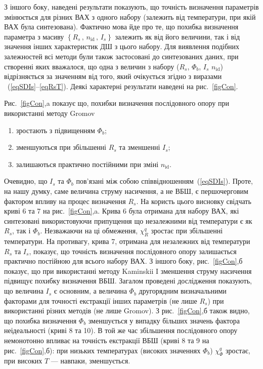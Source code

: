 З іншого боку, наведені результати показують, що точність визначення параметрів змінюється для різних ВАХ з одного набору (залежить від температури, при якій ВАХ була синтезована).
Фактично мова йде про те, що похибка визначення параметра з масиву $\left\{R_s\,,\,n_\mathrm{id}\,,\, I_s\right\}$ залежить як від його величини, так і від значення інших характеристик ДШ з цього набору.
Для виявлення подібних залежностей всі методи були також застосовані до синтезованих даних, при створенні яких вважалося, що одна з величин з набору ($R_s$, $\Phi_b$, $I_s$ $n_\mathrm{id}$) відрізняється за значенням від того, який очікується згідно з виразами ~(\ref{eqSDIs}--\ref{eqRsT}).
Деякі характерні результати наведені на рис.~\ref{figCon}.

Рис.~\ref{figCon},a показує що, похибки визначення послідовного опору при використанні методу Gromov
\begin{enumerate}[label=\asbuk*),leftmargin=0em,itemindent=1.5em]
\item зростають з підвищенням $\Phi_b$;
\item зменшуються при збільшенні $R_s$ та зменшенні $I_s$;
\item залишаються практично постійними при зміні $n_\mathrm{id}$.
\end{enumerate}
Очевидно, що $I_s$ та $\Phi_b$ пов'язані між собою співвідношенням~(\ref{eqSDIs}).
Проте, на нашу думку, саме величина струму насичення, а не ВБШ, є першочерговим фактором впливу на процес визначення $R_s$.
На користь цього висновку свідчать криві 6 та 7 на рис.~\ref{figCon},a.
Крива 6 була отримана для набору ВАХ, які синтезовані використовуючи припущення що незалежними від температури є як $R_s$, так і $\Phi_b$.
Незважаючи на ці обмеження, $\chi^q_R$ зростає при збільшенні температури.
На противагу, крива 7, отримана для незалежних від температури $R_s$ та $I_s$, показує, що точність визначення послідовного опору залишається практично постійною для всього набору ВАХ.
З іншого боку, рис.~\ref{figCon},б показує, що при використанні методу Kaminskii I зменшення струму насичення підвищує похибку визначення ВБШ.
Загалом проведені дослідження показують, що величина $I_s$ є основним, а величина  $\Phi_b$ другорядним визначальними факторами для точності екстракції інших параметрів (не лише $R_s$) при використанні різних методів (не лише Gromov).
З рис.~\ref{figCon},б також видно, що похибка визначення $\Phi_b$ зменшується у випадку більших значень фактора неідеальності (криві 8 та 10).
В той же час збільшення послідовного опору немонотонно впливає на точність екстракції ВБШ (криві 8 та 9 на рис.~\ref{figCon},б):
при низьких температурах (високих значеннях $\Phi_b$) $\chi^q_{\Phi}$ зростає, при високих $T$ --- навпаки, зменшується.


